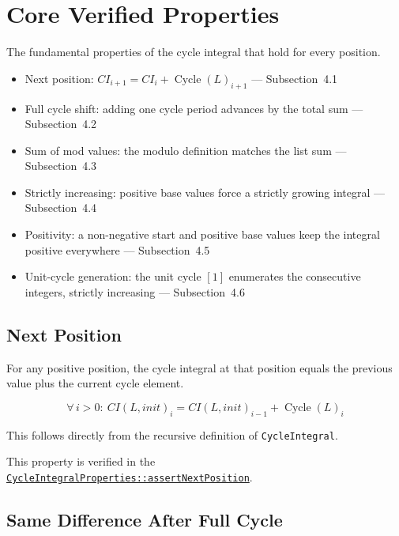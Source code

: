 \section{Core Verified Properties}

The fundamental properties of the cycle integral that hold for every
position.

\begin{itemize}
  \item Next position: $CI_{i+1} = CI_i + \operatorname{Cycle}(L)_{i+1}$ ---
    Subsection~4.1
  \item Full cycle shift: adding one cycle period advances by the total sum
    --- Subsection~4.2
  \item Sum of mod values: the modulo definition matches the list sum ---
    Subsection~4.3
  \item Strictly increasing: positive base values force a strictly growing
    integral --- Subsection~4.4
  \item Positivity: a non-negative start and positive base values keep the
    integral positive everywhere --- Subsection~4.5
  \item Unit-cycle generation: the unit cycle $[1]$ enumerates the
    consecutive integers, strictly increasing --- Subsection~4.6
\end{itemize}

\subsection{Next Position}

For any positive position, the cycle integral at that position equals the
previous value plus the current cycle element.

\begin{equation*}
\forall\, i > 0: \ \mathit{CI}(L, init)_i = \mathit{CI}(L, init)_{i-1} + \operatorname{Cycle}(L)_i
\end{equation*}

This follows directly from the recursive definition of
\texttt{CycleIntegral}.

{\raggedright
This property is verified in the
\href{https://github.com/thiagomata/prime-numbers/blob/integral-cycle-article-v1.0.0/src/main/scala/v1/chapter4/cycle/integral/recursive/properties/CycleIntegralProperties.scala}{\texttt{CycleIntegralProperties::\allowbreak assertNextPosition}}.
\par}

\subsection{Same Difference After Full Cycle}


